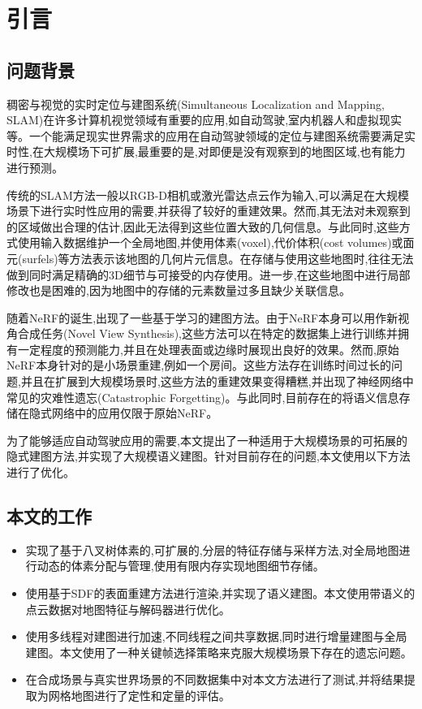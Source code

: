 \section{引言}\label{introduction}

\subsection{问题背景}

稠密与视觉的实时定位与建图系统(Simultaneous Localization and Mapping, SLAM)在许多计算机视觉领域有重要的应用,如自动驾驶,室内机器人和虚拟现实等。一个能满足现实世界需求的应用在自动驾驶领域的定位与建图系统需要满足实时性,在大规模场下可扩展,最重要的是,对即便是没有观察到的地图区域,也有能力进行预测。

传统的SLAM方法一般以RGB-D相机或激光雷达点云作为输入,可以满足在大规模场景下进行实时性应用的需要,并获得了较好的重建效果。然而,其无法对未观察到的区域做出合理的估计,因此无法得到这些位置大致的几何信息。与此同时,这些方式使用输入数据维护一个全局地图,并使用体素(voxel),代价体积(cost volumes)或面元(surfels)等方法表示该地图的几何片元信息。在存储与使用这些地图时,往往无法做到同时满足精确的3D细节与可接受的内存使用。进一步,在这些地图中进行局部修改也是困难的,因为地图中的存储的元素数量过多且缺少关联信息。

随着NeRF\cite{nerf}的诞生,出现了一些基于学习的建图方法。由于NeRF本身可以用作新视角合成任务(Novel View Synthesis),这些方法可以在特定的数据集上进行训练并拥有一定程度的预测能力,并且在处理表面或边缘时展现出良好的效果。然而,原始NeRF本身针对的是小场景重建,例如一个房间。这些方法存在训练时间过长的问题,并且在扩展到大规模场景时,这些方法的重建效果变得糟糕,并出现了神经网络中常见的灾难性遗忘(Catastrophic Forgetting)。与此同时,目前存在的将语义信息存储在隐式网络中的应用仅限于原始NeRF。

为了能够适应自动驾驶应用的需要,本文提出了一种适用于大规模场景的可拓展的隐式建图方法,并实现了大规模语义建图。针对目前存在的问题,本文使用以下方法进行了优化。
\subsection{本文的工作}
\begin{itemize}
	\item 实现了基于八叉树体素的,可扩展的,分层的特征存储与采样方法,对全局地图进行动态的体素分配与管理,使用有限内存实现地图细节存储。
	\item 使用基于SDF的表面重建方法进行渲染,并实现了语义建图。本文使用带语义的点云数据对地图特征与解码器进行优化。
	\item 使用多线程对建图进行加速,不同线程之间共享数据,同时进行增量建图与全局建图。本文使用了一种关键帧选择策略来克服大规模场景下存在的遗忘问题。
	\item 在合成场景与真实世界场景的不同数据集中对本文方法进行了测试,并将结果提取为网格地图进行了定性和定量的评估。
\end{itemize}


